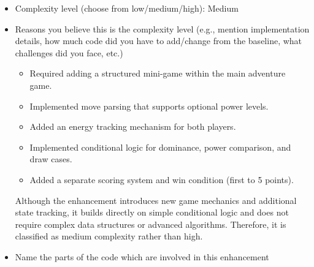\documentclass[11pt]{article}
\begin{document}
\begin{enumerate}
\begin{itemize}
\bigskip
Scoring:
\begin{itemize}
\item Winner earns 1 point.
\item First player to reach 5 points wins the Arena.
\end{itemize}

\bigskip
Energy regeneration after each round:
\begin{itemize}
\item Winner gains +1 energy.
\item Loser gains +2 energy.
\item Draw: both gain +1 energy.
\end{itemize}

\bigskip
        \item Complexity level (choose from low/medium/high): Medium
        \item Reasons you believe this is the complexity level (e.g., mention implementation details, how much code did you have to add/change from the baseline, what challenges did you face, etc.)
        \begin{itemize}
            \item Required adding a structured mini-game within the main adventure game.
            \item Implemented move parsing that supports optional power levels.
            \item Added an energy tracking mechanism for both players.
            \item Implemented conditional logic for dominance, power comparison, and draw cases.
            \item Added a separate scoring system and win condition (first to 5 points).
        \end{itemize}
\bigskip
        Although the enhancement introduces new game mechanics and additional state tracking, it builds directly on simple conditional logic and does not require complex data structures or advanced algorithms. Therefore, it is classified as medium complexity rather than high.

        \item Name the parts of the code which are involved in this enhancement


\end{itemize}
\end{enumerate}
\end{document}
